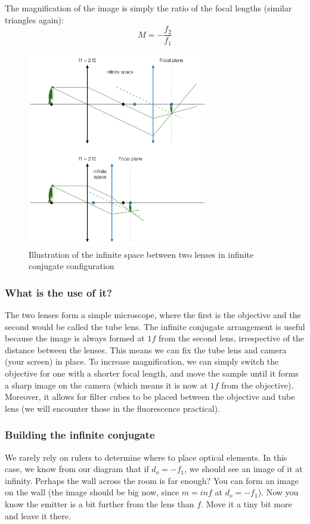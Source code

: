 \documentclass[a4paper]{report}
\begin{document}
	The magnification of the image is simply the ratio of the focal lengths (similar triangles again): 
	\begin{equation}
	M=-\frac{f_2}{f_1}
	\label{eq:magIC}
	\end{equation}
	
	\begin{figure}[h]
		\center
		\includegraphics[width=0.7\textwidth]{figures/hint_infinite_conjugate.png}
		\caption{Illustration of the infinite space between two lenses in infinite conjugate configuration}
		\label{hint_infinite}
	\end{figure}

    
	\subsubsection{What is the use of it?}
	The two lenses form a simple microscope, where the first is the objective and the second would be called the tube lens. The infinite conjugate arrangement is useful because the image is always formed at $1f$ from the second lens, irrespective of the distance between the lenses. This means we can fix the tube lens and camera (your screen) in place. To increase magnification, we can simply switch the objective for one with a shorter focal length, and move the sample until it forms a sharp image on the camera (which means it is now at $1f$ from the objective). Moreover, it allows for filter cubes to be placed between the objective and tube lens (we will encounter those in the fluorescence practical). 

    
    \subsubsection{Building the infinite conjugate}
	We rarely rely on rulers to determine where to place optical elements. In this case, we know from our diagram that if $d_o=-f_1$, we should see an image of it at infinity. Perhaps the wall across the room is far enough? You can form an image on the wall (the image should be big now, since $m=inf$ at $d_o=-f_1$). Now you know the emitter is a bit further from the lens than $f$. Move it a tiny bit more and leave it there. 
\end{document}
